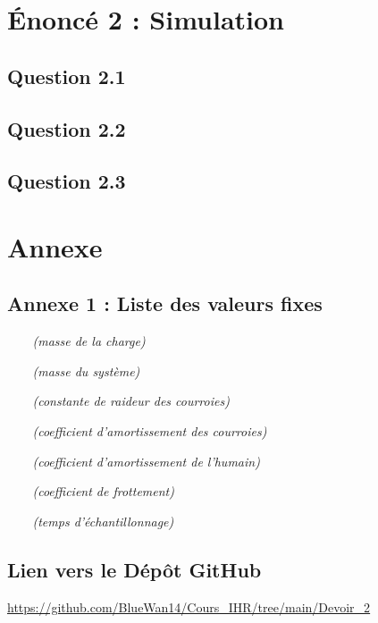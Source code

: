 \documentclass[a4paper,12pt]{article}
\begin{document}
\newpage
\section{Énoncé 2 : Simulation}
\subsection{Question 2.1}

\subsection{Question 2.2}

\subsection{Question 2.3}



\newpage
\section{Annexe}
\subsection{Annexe 1 : Liste des valeurs fixes}
\begin{itemize}
    \item[$$]  \textit{(masse de la charge)}
    \item[$$]  \textit{(masse du système)}
    \item[$$]  \textit{(constante de raideur des courroies)}
    \item[$$]  \textit{(coefficient d'amortissement des courroies)}
    \item[$$]  \textit{(coefficient d'amortissement de l'humain)}
    \item[$$]  \textit{(coefficient de frottement)}
    \item[$$]  \textit{(temps d'échantillonnage)}
\end{itemize}


\subsection{Lien vers le Dépôt GitHub}
\url{https://github.com/BlueWan14/Cours_IHR/tree/main/Devoir_2}
\end{document}
